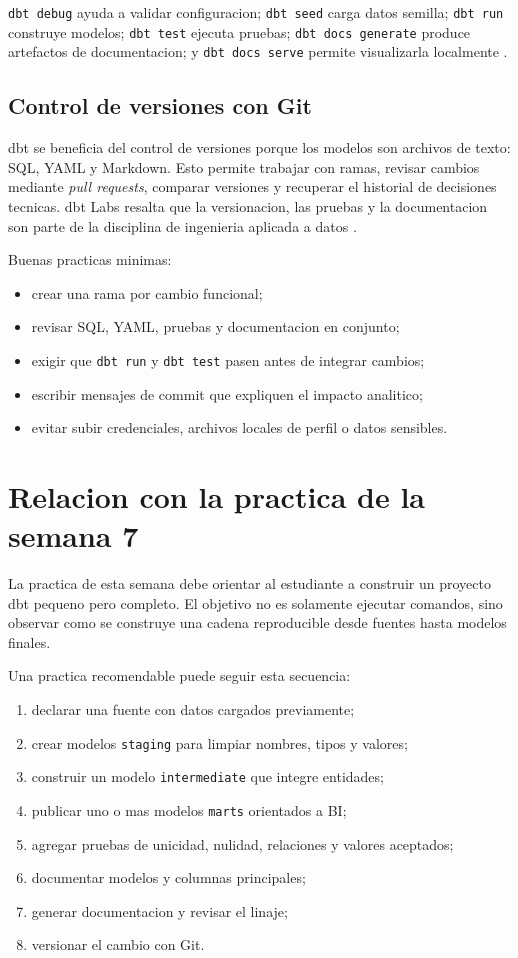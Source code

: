 \documentclass[12pt]{article}
\begin{document}
\texttt{dbt debug} ayuda a validar configuracion; \texttt{dbt seed} carga datos semilla; \texttt{dbt run} construye modelos; \texttt{dbt test} ejecuta pruebas; \texttt{dbt docs generate} produce artefactos de documentacion; y \texttt{dbt docs serve} permite visualizarla localmente \cite{dbt_commands}.

\subsection{Control de versiones con Git}
dbt se beneficia del control de versiones porque los modelos son archivos de texto: SQL, YAML y Markdown. Esto permite trabajar con ramas, revisar cambios mediante \textit{pull requests}, comparar versiones y recuperar el historial de decisiones tecnicas. dbt Labs resalta que la versionacion, las pruebas y la documentacion son parte de la disciplina de ingenieria aplicada a datos \cite{dbt_explained}.

Buenas practicas minimas:

\begin{itemize}[leftmargin=*]
\item crear una rama por cambio funcional;
\item revisar SQL, YAML, pruebas y documentacion en conjunto;
\item exigir que \texttt{dbt run} y \texttt{dbt test} pasen antes de integrar cambios;
\item escribir mensajes de commit que expliquen el impacto analitico;
\item evitar subir credenciales, archivos locales de perfil o datos sensibles.
\end{itemize}

\section{Relacion con la practica de la semana 7}
La practica de esta semana debe orientar al estudiante a construir un proyecto dbt pequeno pero completo. El objetivo no es solamente ejecutar comandos, sino observar como se construye una cadena reproducible desde fuentes hasta modelos finales.

Una practica recomendable puede seguir esta secuencia:

\begin{enumerate}[label=\textbf{P\arabic*.}, leftmargin=*]
\item declarar una fuente con datos cargados previamente;
\item crear modelos \texttt{staging} para limpiar nombres, tipos y valores;
\item construir un modelo \texttt{intermediate} que integre entidades;
\item publicar uno o mas modelos \texttt{marts} orientados a BI;
\item agregar pruebas de unicidad, nulidad, relaciones y valores aceptados;
\item documentar modelos y columnas principales;
\item generar documentacion y revisar el linaje;
\item versionar el cambio con Git.
\end{enumerate}
\end{document}
